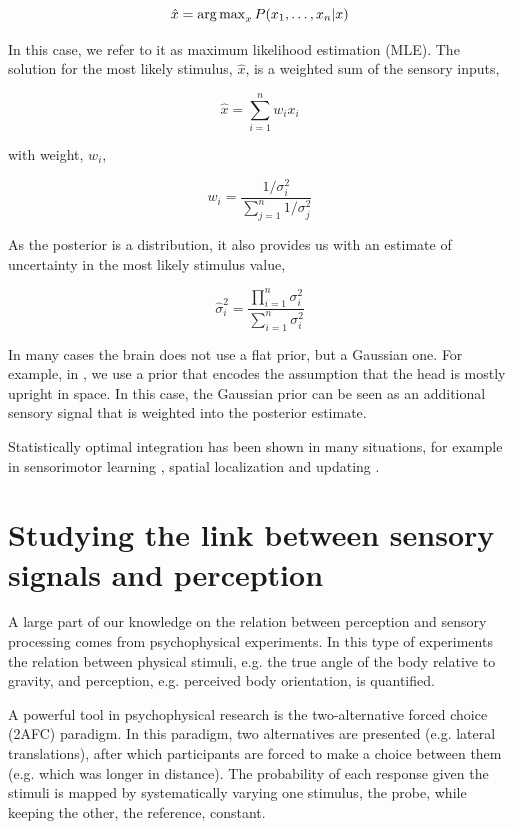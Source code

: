\begin{equation}
\hat{x} = \operatorname{arg\,max}_x P(x_1,\dotsc,x_n|x)
\label{intro:eq:mle}
\end{equation}

In this case, we refer to it as maximum likelihood estimation (MLE). The solution for the most likely stimulus, $\hat{x}$, is a weighted sum of the sensory inputs,

\begin{equation}
\hat{x}=\sum_{i=1}^n w_i x_i
\end{equation}

with weight, $w_i$,

\begin{equation}
w_i = \frac{1/\sigma^2_i}{\sum_{j=1}^n 1/\sigma^2_j}
\end{equation}

As the posterior is a distribution, it also provides us with an estimate of uncertainty in  the most likely stimulus value,

\begin{equation}
\hat{\sigma}^2_i = \frac{\prod_{i=1}^n \sigma^2_i}{\sum_{i=1}^n \sigma^2_i}
\end{equation}

In many cases the brain does not use a flat prior, but a Gaussian one. For example, in , we use a prior that encodes the assumption that the head is mostly upright in space. In this case, the Gaussian prior can be seen as an additional sensory signal that is weighted into the posterior estimate.

Statistically optimal integration has been shown in many situations, for example in sensorimotor learning \cite{kording2004}, spatial localization \cite{battaglia2003} and updating \cite{vaziri2006}.


\section{Studying the link between sensory signals and perception}

A large part of our knowledge on the relation between perception and sensory processing comes from psychophysical experiments. In this type of experiments the relation between physical stimuli, e.g. the true angle of the body relative to gravity, and perception, e.g. perceived body orientation, is quantified.

A powerful tool in psychophysical research is the two-alternative forced choice (2AFC) paradigm. In this paradigm, two alternatives are presented (e.g. lateral translations), after which participants are forced to make a choice between them (e.g. which was longer in distance). The probability of each response given the stimuli is mapped by systematically varying one stimulus, the probe, while keeping the other, the reference, constant.

